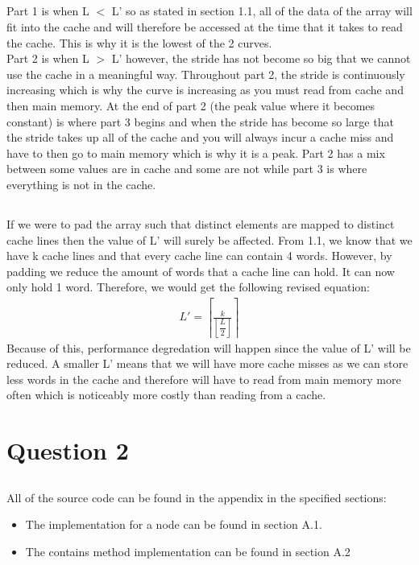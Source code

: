 \documentclass[11pt]{article}
\begin{document}
\subsection{}
Part 1 is when L $<$ L' so as stated in section 1.1, all of the data of the array will fit into the cache and will therefore be accessed at 
the time that it takes to read the cache. This is why it is the lowest of the 2 curves. \\
Part 2 is when L $>$ L' however, the stride has not become so big that we cannot use the cache in a meaningful way. Throughout part 2, the 
stride is continuously increasing which is why the curve is increasing as you must read from cache and then main memory. At the end of 
part 2 (the peak value where it becomes constant) is where part 3 begins and when the stride has become so large that the stride takes 
up all of the cache and you will always incur a cache miss and have to then go to main memory which is why it is a peak. Part 2 has a mix 
between some values are in cache and some are not while part 3 is where everything is not in the cache. 

\subsection{}
If we were to pad the array such that distinct elements are mapped to distinct cache lines then the value of L' will surely be affected.
From 1.1, we know that we have k cache lines and that every cache line can contain 4 words. However, by padding we reduce the amount of 
words that a cache line can hold. It can now only hold 1 word. Therefore, we would get the following revised equation:
\begin{equation}
	\begin{split}
		L' = \left\lceil\frac{k}{\left\lfloor\dfrac{L}{2}\right\rfloor}\right\rceil
	\end{split}
\end{equation}
Because of this, performance degredation will happen since the value of L' will be reduced. A smaller L' means that we will have more cache 
misses as we can store less words in the cache and therefore will have to read from main memory more often which is noticeably more costly 
than reading from a cache.

\section{Question 2}

\subsection{}
All of the source code can be found in the appendix in the specified sections:
\begin{itemize}
	\item The implementation for a node can be found in section A.1. 
	\item The contains method implementation can be found in section A.2 
\end{itemize}
\end{document}
